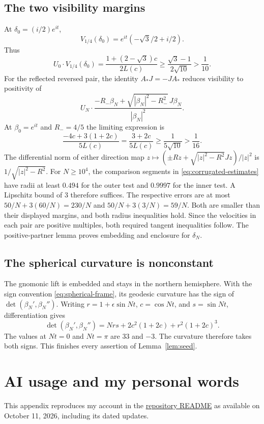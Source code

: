 \documentclass[11pt]{amsart}
\theoremstyle{definition}
\theoremstyle{remark}
\numberwithin{equation}{section}
\begin{document}
\subsection{The two visibility margins}
At $\delta_0=(i/2)e^{it}$,
\[
 V_{1/4}(\delta_0)=e^{it}(-\sqrt3/2+i/2).
\]
Thus
\begin{equation}\label{eq:outer-limit-visibility}
 U_0\cdot V_{1/4}(\delta_0)
 =\frac{1+(2-\sqrt3)c}{2L(c)}
 \ge\frac{\sqrt3-1}{2\sqrt{10}}>\frac1{10}.
\end{equation}
For the reflected reversed pair, the identity $A_*J=-JA_*$ reduces
visibility to positivity of
\[
 U_N\cdot\frac{-R_-\beta_N+
             \sqrt{|\beta_N|^2-R_-^2}\,J\beta_N}{|\beta_N|^2}.
\]
At $\beta_0=e^{it}$ and $R_-=4/5$ the limiting expression is
\begin{equation}\label{eq:inner-limit-visibility}
 \frac{-4c+3(1+2c)}{5L(c)}
 =\frac{3+2c}{5L(c)}\ge\frac1{5\sqrt{10}}>\frac1{16}.
\end{equation}
The differential norm of either direction map
$z\mapsto(\pm Rz+\sqrt{|z|^2-R^2}Jz)/|z|^2$ is
$1/\sqrt{|z|^2-R^2}$. For $N\ge10^4$, the comparison segments in
\eqref{eq:corrugated-estimates} have radii at least $0.494$ for the
outer test and $0.9997$ for the inner test. A Lipschitz bound of $3$
therefore suffices. The respective errors are at most
$50/N+3(60/N)=230/N$ and $50/N+3(3/N)=59/N$.
Both are smaller than their displayed margins, and both radius
inequalities hold. Since the velocities in each pair are positive
multiples, both required tangent inequalities follow. The positive-partner
lemma proves embedding and enclosure for $\delta_N$.

\subsection{The spherical curvature is nonconstant}
The gnomonic lift is embedded and stays in the northern hemisphere.
With the sign convention \eqref{eq:spherical-frame}, its geodesic
curvature has the sign of $\det(\beta_N',\beta_N'')$. Writing
$r=1+\epsilon\sin Nt$, $c=\cos Nt$, and $s=\sin Nt$, differentiation gives
\[
 \det(\beta_N',\beta_N'')
 =Nr s+2c^2(1+2c)+r^2(1+2c)^3.
\]
The values at $Nt=0$ and $Nt=\pi$ are $33$ and $-3$.
The curvature therefore takes both signs. This finishes every assertion
of Lemma~\ref{lem:seed}.

\section{AI usage and my personal words}\label{app:ai-account}
This appendix reproduces my account in the \href{https://github.com/zhangyuetong/smooth-tight-nonrigidity/blob/6a0758c99077e2c7fd31c3de6ee3452b3f6df8d3/README.md#ai-usage-and-my-personal-words}{repository README} as available on October 11, 2026, including its dated updates.
\end{document}
